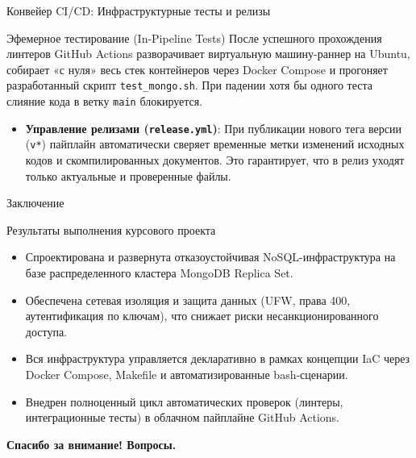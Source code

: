 \documentclass[10pt]{beamer}
\begin{document}
	\begin{frame}{Конвейер CI/CD: Инфраструктурные тесты и релизы}
		\begin{block}{Эфемерное тестирование (In-Pipeline Tests)}
			После успешного прохождения линтеров GitHub Actions разворачивает виртуальную машину-раннер на Ubuntu, собирает «с нуля» весь стек контейнеров через Docker Compose и прогоняет разработанный скрипт \texttt{test\_mongo.sh}. При падении хотя бы одного теста слияние кода в ветку \texttt{main} блокируется.
		\end{block}
		\vfill
		\begin{itemize}
			\item \textbf{Управление релизами (\texttt{release.yml})}: При публикации нового тега версии (\texttt{v*}) пайплайн автоматически сверяет временные метки изменений исходных кодов и скомпилированных документов. Это гарантирует, что в релиз уходят только актуальные и проверенные файлы.
		\end{itemize}
	\end{frame}
	
	\begin{frame}{Заключение}
		\begin{block}{Результаты выполнения курсового проекта}
			\begin{itemize}
				\item Спроектирована и развернута отказоустойчивая NoSQL-инфраструктура на базе распределенного кластера MongoDB Replica Set.
				\item Обеспечена сетевая изоляция и защита данных (UFW, права 400, аутентификация по ключам), что снижает риски несанкционированного доступа.
				\item Вся инфраструктура управляется декларативно в рамках концепции IaC через Docker Compose, Makefile и автоматизированные bash-сценарии.
				\item Внедрен полноценный цикл автоматических проверок (линтеры, интеграционные тесты) в облачном пайплайне GitHub Actions.
			\end{itemize}
		\end{block}
		\vfill
		\begin{center}
			\textsf{\large \textbf{Спасибо за внимание! Вопросы.}}
		\end{center}
	\end{frame}
	
\end{document}
